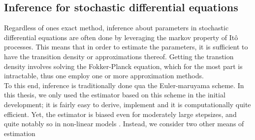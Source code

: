 \subsection{Inference for stochastic differential equations}
Regardless of ones exact method, inference about parameters in stochastic differential equations are often done by leveraging the markov property of Itô processes. This means that in order to estimate the parameters, it is sufficient to have the transition density or approximations thereof. Getting the transtion density involves solving the Fokker-Planck equation, which for the most part is intractable, thus one employ one or more approximation methods.\\
To this end, inference is traditionally done qua the Euler-maruyama scheme. In this thesis, we only used the estimator based on this scheme in the initial development; it is fairly easy to derive, implement and it is computationally quite efficient. Yet, the estimator is biased even for moderately large stepsizes, and quite notably so in non-linear models \cite{SplittingSchemes}. Instead, we consider two other means of estimation 

